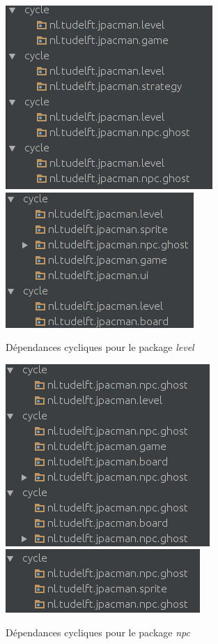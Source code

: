 \documentclass[12pt, openany]{report}
\begin{document}
\begin{figure}[!h]
	\centering
	\includegraphics[scale=0.6]{Images/CyclicDependencyFinal4.png} 
	\includegraphics[scale=0.6]{Images/CyclicDependencyFinal5.png}   
		\caption{Dépendances cycliques pour le package \textit{level}}
	\label{CyclicDependencyFinal3}
\end{figure}

\begin{figure}[!h]
	\centering
	\includegraphics[scale=0.6]{Images/CyclicDependencyFinal7.png} 
	\includegraphics[scale=0.6]{Images/CyclicDependencyFinal8.png}   
		\caption{Dépendances cycliques pour le package \textit{npc}}
	\label{CyclicDependencyFinal4}
\end{figure}
\end{document}
